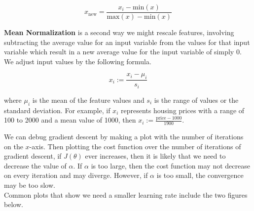 \documentclass{article}
\begin{document}
        \begin{equation*}
            x_{\text{new}} = \frac{x_i-\text{min}(x)}{\text{max}(x)-\text{min}(x)}
        \end{equation*}

        \noindent \textbf{Mean Normalization} is a second way we might rescale features, involving subtracting
        the average value for an input variable from the values for that input variable which result in a new
        average value for the input variable of simply 0. We adjust input values by the following formula.

        \begin{equation*}
            x_i := \frac{x_i - \mu_i}{s_i}
        \end{equation*}

        \noindent where $\mu_i$ is the mean of the feature values and $s_i$ is the range of values or the
        standard deviation. For example, if $x_i$ represents housing prices with a range of 100 to 2000
        and a mean value of 1000, then $x_i := \frac{\text{price}-1000}{1900}$.

        \pagebreak
        \noindent We can debug gradient descent by making a plot with the number of iterations on the $x$-axis.
        Then plotting the cost function over the number of iterations of gradient descent, if $J(\theta)$ ever
        increases, then it is likely that we need to decrease the value of $\alpha$. If $\alpha$ is too large,
        then the cost function may not decrease on every iteration and may diverge. However, if $\alpha$ is
        too small, the convergence may be too slow. \\

        \noindent Common plots that show we need a smaller learning rate include the two figures below.
\end{document}

